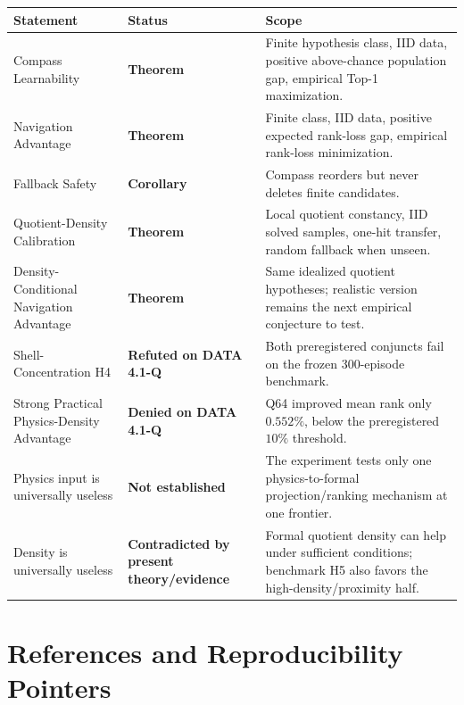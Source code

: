 \documentclass[11pt]{article}
\begin{document}
\begin{center}
\begin{tabularx}{\textwidth}{>{\raggedright\arraybackslash}p{} >{\raggedright\arraybackslash}p{} X}
\toprule
Statement & Status & Scope \\
\midrule
Compass Learnability & \textbf{Theorem} & Finite hypothesis class, IID data, positive above-chance population gap, empirical Top-1 maximization. \\
Navigation Advantage & \textbf{Theorem} & Finite class, IID data, positive expected rank-loss gap, empirical rank-loss minimization. \\
Fallback Safety & \textbf{Corollary} & Compass reorders but never deletes finite candidates. \\
Quotient-Density Calibration & \textbf{Theorem} & Local quotient constancy, IID solved samples, one-hit transfer, random fallback when unseen. \\
Density-Conditional Navigation Advantage & \textbf{Theorem} & Same idealized quotient hypotheses; realistic version remains the next empirical conjecture to test. \\
Shell-Concentration H4 & \textbf{Refuted on DATA 4.1-Q} & Both preregistered conjuncts fail on the frozen 300-episode benchmark. \\
Strong Practical Physics-Density Advantage & \textbf{Denied on DATA 4.1-Q} & Q64 improved mean rank only $0.552\%$, below the preregistered $10\%$ threshold. \\
Physics input is universally useless & \textbf{Not established} & The experiment tests only one physics-to-formal projection/ranking mechanism at one frontier. \\
Density is universally useless & \textbf{Contradicted by present theory/evidence} & Formal quotient density can help under sufficient conditions; benchmark H5 also favors the high-density/proximity half. \\
\bottomrule
\end{tabularx}
\end{center}

\section{References and Reproducibility Pointers}
\end{document}

